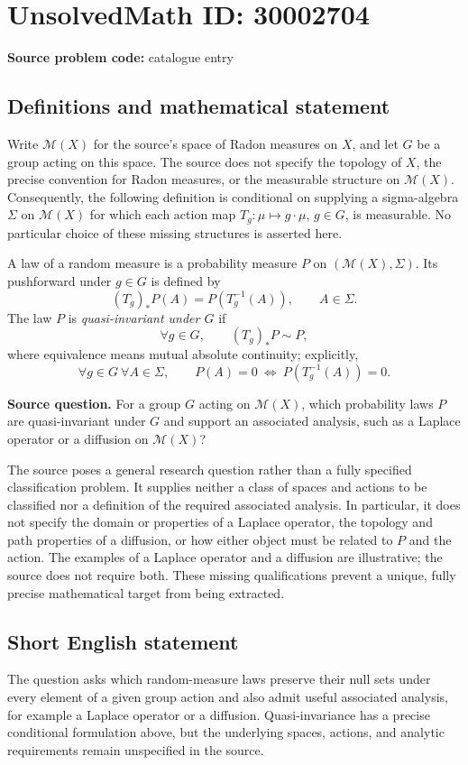 \documentclass[11pt]{article}
\begin{document}
\section*{UnsolvedMath ID: 30002704}
\textbf{Source problem code:} catalogue entry
\subsection{Definitions and mathematical statement}
Write \(\mathcal M(X)\) for the source's space of Radon measures on \(X\), and let \(G\) be a group acting on this space. The source does not specify the topology of \(X\), the precise convention for Radon measures, or the measurable structure on \(\mathcal M(X)\). Consequently, the following definition is conditional on supplying a sigma-algebra \(\Sigma\) on \(\mathcal M(X)\) for which each action map \(T_g:\mu\mapsto g\cdot\mu\), \(g\in G\), is measurable. No particular choice of these missing structures is asserted here.

A law of a random measure is a probability measure \(P\) on \((\mathcal M(X),\Sigma)\). Its pushforward under \(g\in G\) is defined by
\[
 (T_g)_*P(A)=P(T_g^{-1}(A)),\qquad A\in\Sigma.
\]
The law \(P\) is \emph{quasi-invariant under \(G\)} if
\[
 \forall g\in G,\qquad (T_g)_*P\sim P,
\]
where equivalence means mutual absolute continuity; explicitly,
\[
 \forall g\in G\ \forall A\in\Sigma,\qquad
 P(A)=0\ \Longleftrightarrow\ P(T_g^{-1}(A))=0.
\]

\textbf{Source question.} For a group \(G\) acting on \(\mathcal M(X)\), which probability laws \(P\) are quasi-invariant under \(G\) and support an associated analysis, such as a Laplace operator or a diffusion on \(\mathcal M(X)\)?

The source poses a general research question rather than a fully specified classification problem. It supplies neither a class of spaces and actions to be classified nor a definition of the required associated analysis. In particular, it does not specify the domain or properties of a Laplace operator, the topology and path properties of a diffusion, or how either object must be related to \(P\) and the action. The examples of a Laplace operator and a diffusion are illustrative; the source does not require both. These missing qualifications prevent a unique, fully precise mathematical target from being extracted.
\subsection{Short English statement}
The question asks which random-measure laws preserve their null sets under every element of a given group action and also admit useful associated analysis, for example a Laplace operator or a diffusion. Quasi-invariance has a precise conditional formulation above, but the underlying spaces, actions, and analytic requirements remain unspecified in the source.
\end{document}

